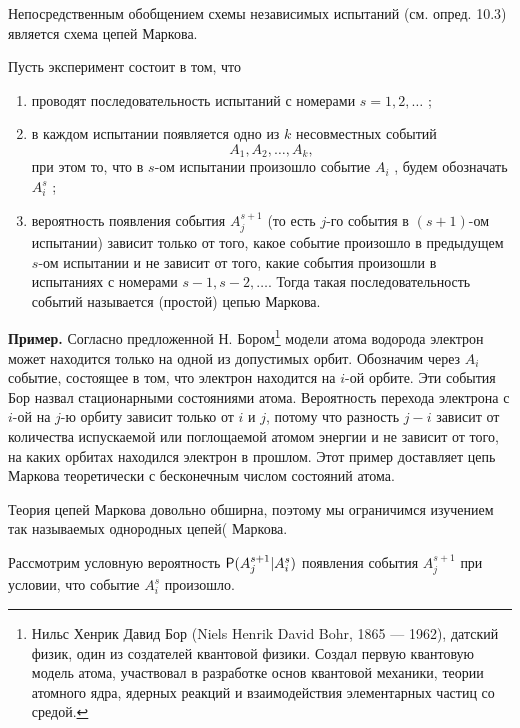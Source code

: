 
Непосредственным обобщением схемы независимых испытаний (см. опред.
10.3) является схема цепей Маркова.

\begin{definition}
Пусть эксперимент состоит в том, что
\begin{enumerate}
	\item проводят последовательность испытаний с номерами $s = 1, 2, \ldots$ ;\\
	\item в каждом испытании появляется одно из $k$ несовместных событий
	$$A_1 , A_2 , \ldots , A_k,$$ при этом то, что в $s$-ом испытании произошло событие $A_i$ , будем обозначать $A^s_i$ ;\\
	\item вероятность появления события $A^{s+1}_j$ (то есть $j$-го события в $(s+1)$-ом испытании) зависит только от того, какое событие произошло в предыдущем $s$-ом испытании и не зависит от того, какие события произошли в испытаниях с номерами $s − 1, s − 2, \ldots $.
Тогда такая последовательность событий называется (простой) цепью Маркова.
\end{enumerate}

\end{definition}

\textbf{Пример.} Согласно предложенной Н. Бором\footnote{Нильс Хенрик Давид Бор (Niels Henrik David Bohr, 1865 — 1962), датский физик, один из создателей
квантовой физики. Создал первую квантовую модель атома, участвовал в разработке основ квантовой
механики, теории атомного ядра, ядерных реакций и взаимодействия элементарных частиц со средой.
} модели атома водорода электрон может находится только на одной из допустимых орбит. Обозначим через  $A_i$ событие, состоящее в том, что электрон находится на
$i$-ой орбите. Эти события Бор назвал стационарными состояниями атома. Вероятность перехода электрона с $i$-ой на $j$-ю орбиту зависит только от $i$ и $j$, потому что разность $j − i$ зависит от количества испускаемой
или поглощаемой атомом энергии и не зависит от того, на каких орбитах находился электрон в прошлом. Этот пример доставляет цепь Маркова теоретически с бесконечным числом состояний атома.

Теория цепей Маркова довольно обширна, поэтому мы ограничимся изучением так называемых однородных цепей( Маркова.

Рассмотрим условную вероятность $\P(A^{s+1}_j|A^s_i)$ появления события $A_j^{s+1}$ при условии, что событие $A^s_i$ произошло.

